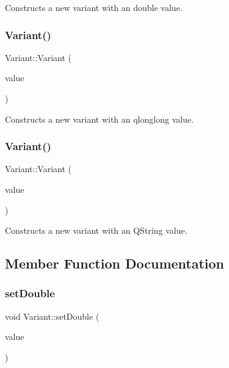 Constructs a new variant with an double value. 

\mbox{\label{class_variant_a6f86cea152e761f48700e41f210fe251}} 
\subsubsection{\texorpdfstring{Variant()}{Variant()}\hspace{0.1cm}{\footnotesize\ttfamily [4/5]}}
{\footnotesize\ttfamily Variant\+::\+Variant (\begin{DoxyParamCaption}\item[{qlonglong}]{value }\end{DoxyParamCaption})\hspace{0.3cm}{\ttfamily [explicit]}}



Constructs a new variant with an qlonglong value. 

\mbox{\label{class_variant_a2a2d8b7cc035142a795f86d481adde0c}} 
\subsubsection{\texorpdfstring{Variant()}{Variant()}\hspace{0.1cm}{\footnotesize\ttfamily [5/5]}}
{\footnotesize\ttfamily Variant\+::\+Variant (\begin{DoxyParamCaption}\item[{const Q\+String \&}]{value }\end{DoxyParamCaption})\hspace{0.3cm}{\ttfamily [explicit]}}



Constructs a new variant with an Q\+String value. 



\subsection{Member Function Documentation}
\mbox{\label{class_variant_a9cf99c99f688ecafaf0ccfe1fb6aee52}} 
\subsubsection{\texorpdfstring{set\+Double}{setDouble}}
{\footnotesize\ttfamily void Variant\+::set\+Double (\begin{DoxyParamCaption}\item[{double}]{value }\end{DoxyParamCaption})\hspace{0.3cm}{\ttfamily [slot]}}



